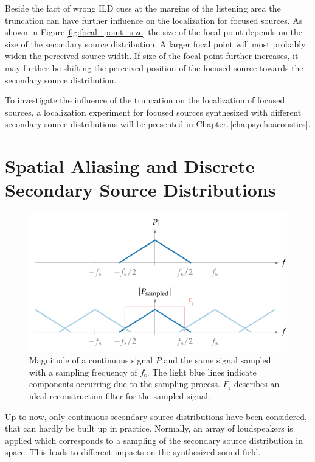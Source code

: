 Beside the fact of wrong \ac{ILD} cues at the margins of the listening area the
truncation can have further influence on the localization for focused
sources. As shown in Figure\,\ref{fig:focal_point_size} the size of the focal
point depends on the size of the secondary source distribution. A larger focal
point will most probably widen the perceived source width. If size of the focal
point further increases, it may further be shifting the perceived position of the
focused source towards the secondary source distribution.

To investigate the influence of the truncation on the localization of
focused sources, a localization experiment for focused sources synthesized with
different secondary source distributions will be presented in
Chapter.\,\ref{cha:psychoacoustics}.


\section[Spatial Aliasing and Discretization]{Spatial Aliasing and Discrete Secondary Source Distributions}
\label{sec:spatial_aliasing_and_discrete_secondary_source_distributions}

%
\begin{figure}
    \includegraphics{fig3_07/fig3_07}
    \caption{Magnitude of a continuous signal $P$ and the same signal
    sampled with a sampling frequency of $f_\text{s}$. The light blue lines
    indicate components occurring due to the sampling process. $F_\text{r}$
    describes an ideal reconstruction filter for the sampled signal.
    }
    \label{fig:sampling}
\end{figure}
%
\noindent Up to now, only continuous secondary source distributions have been
considered, that can hardly be built up in practice. Normally, an array of
loudspeakers is applied which corresponds to a sampling of the secondary source
distribution in space. This leads to different impacts on the synthesized sound
field.

